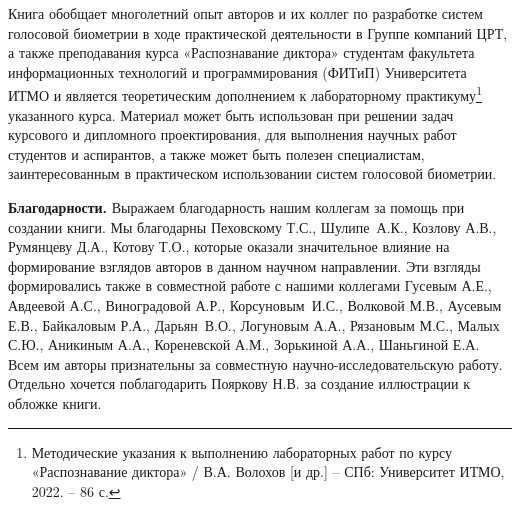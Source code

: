 \documentclass[12pt]{book}
\begin{document}
\large{Книга обобщает многолетний опыт авторов и их коллег по разработке систем голосовой биометрии в ходе практической деятельности в Группе компаний ЦРТ, а также преподавания курса «Распознавание диктора» студентам факультета информационных технологий и программирования (ФИТиП) Университета ИТМО и является теоретическим дополнением к лабораторному практикуму\footnote{Методические указания к выполнению лабораторных работ по курсу
«Распознавание диктора» / В.А. Волохов [и др.] -- СПб: Университет ИТМО, 2022. -- 86 с.} указанного курса. Материал может быть использован при решении задач курсового и дипломного проектирования, для выполнения научных работ студентов и аспирантов, а также может быть полезен специалистам, заинтересованным в практическом использовании систем голосовой биометрии.}

\large{\textbf{Благодарности.} Выражаем благодарность нашим коллегам за помощь при создании книги. Мы благодарны Пеховскому Т.С., Шулипе~А.К., Козлову А.В., Румянцеву Д.А., Котову Т.О., которые оказали значительное влияние на формирование взглядов авторов в данном научном направлении. Эти взгляды формировались также в совместной работе с нашими коллегами Гусевым А.Е., Авдеевой А.С., Виноградовой А.Р., Корсуновым~И.С., Волковой М.В., Аусевым Е.В., Байкаловым Р.А., Дарьян~В.О., Логуновым А.А., Рязановым М.С., Малых С.Ю., Аникиным А.А., Кореневской А.М., Зорькиной А.А., Шаньгиной Е.А. Всем им авторы признательны за совместную научно-исследовательскую работу. Отдельно хочется поблагодарить Пояркову Н.В. за создание иллюстрации к обложке книги.}
\end{document}
